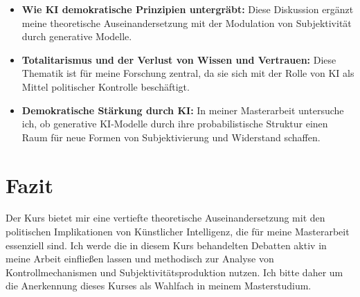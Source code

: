 \documentclass[a4paper,11pt]{article}
\begin{document}
\begin{itemize}
	\item \textbf{Wie KI demokratische Prinzipien untergräbt:} Diese Diskussion ergänzt meine theoretische Auseinandersetzung mit der Modulation von Subjektivität durch generative Modelle.
	\item \textbf{Totalitarismus und der Verlust von Wissen und Vertrauen:} Diese Thematik ist für meine Forschung zentral, da sie sich mit der Rolle von KI als Mittel politischer Kontrolle beschäftigt.
	\item \textbf{Demokratische Stärkung durch KI:} In meiner Masterarbeit untersuche ich, ob generative KI-Modelle durch ihre probabilistische Struktur einen Raum für neue Formen von Subjektivierung und Widerstand schaffen.
\end{itemize}

\section{Fazit}

Der Kurs bietet mir eine vertiefte theoretische Auseinandersetzung mit den politischen Implikationen von Künstlicher Intelligenz, die für meine Masterarbeit essenziell sind. Ich werde die in diesem Kurs behandelten Debatten aktiv in meine Arbeit einfließen lassen und methodisch zur Analyse von Kontrollmechanismen und Subjektivitätsproduktion nutzen. Ich bitte daher um die Anerkennung dieses Kurses als Wahlfach in meinem Masterstudium.

\vspace{1cm}
\end{document}
